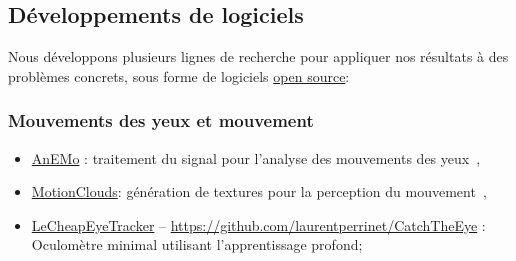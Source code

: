 \documentclass[10pt,french,a4paper,oneside]{article}%
\begin{document}
\begin{itemize}
\end{itemize}


\subsection{Développements de logiciels} %

Nous développons plusieurs lignes de recherche pour appliquer nos résultats à des problèmes concrets, sous forme de logiciels \href{https://laurentperrinet.github.io/project/open-science/}{open source}:

\subsubsection{Mouvements des yeux et mouvement} %
\begin{itemize}

	\item \href{https://github.com/invibe/AnEMo}{AnEMo} : traitement du signal pour l'analyse des mouvements des yeux~\citep{Pasturel18anemo},
	\item \href{http://github.com/NeuralEnsemble/MotionClouds}{MotionClouds}: génération de textures pour la perception du mouvement~\citep{Sanz12,Vacher15nips,Vacher16},
	\item \href{https://github.com/laurentperrinet/LeCheapEyeTracker}{LeCheapEyeTracker} -- \url{https://github.com/laurentperrinet/CatchTheEye} : Oculomètre minimal utilisant l'apprentissage profond;
\end{itemize}
\end{document}
